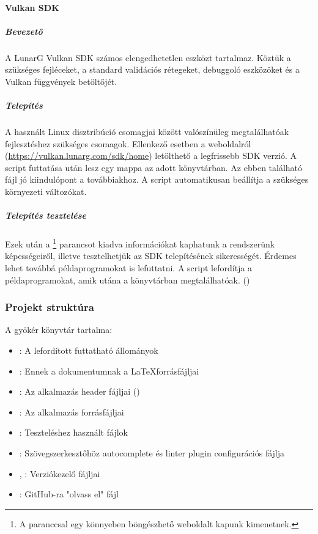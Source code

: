 \paragraph{Vulkan SDK}\label{vulkansdk}
\subparagraph{Bevezet\H o}
A LunarG Vulkan SDK sz\'amos elengedhetetlen eszk\"ozt tartalmaz. K\"ozt\"uk a sz\"uks\'eges fejl\'eceket, a standard valid\'aci\'os r\'etegeket, debuggol\'o eszk\"oz\"oket \'es a Vulkan f\"uggv\'enyek bet\"olt\H oj\'et.
\subparagraph{Telep\'it\'es}
A haszn\'alt Linux disztrib\'uci\'o csomagjai k\"oz\"ott val\'osz\'in\"uleg megtal\'alhat\'oak fejleszt\'eshez sz\"uks\'eges csomagok. 
\newline
Ellenkez\H o esetben a weboldalr\'ol (\url{https://vulkan.lunarg.com/sdk/home}) let\"olthet\H o a legfrissebb SDK verzi\'o.
A script futtat\'asa ut\'an lesz egy  mappa az adott k\"onyvt\'arban.
Az ebben tal\'alhat\'o  f\'ajl j\'o kiindul\'opont a tov\'abbiakhoz.
A  script automatikusan be\'all\'itja a sz\"uks\'eges k\"ornyezeti v\'altoz\'okat.
\subparagraph{Telep\'it\'es tesztel\'ese}
Ezek ut\'an a \footnote{A  paranccsal egy k\"onnyeben b\"ong\'eszhet\H o weboldalt kapunk kimenetnek.} parancsot kiadva inform\'aci\'okat kaphatunk a rendszer\"unk k\'epess\'egeir\H ol, illetve tesztelhetj\"uk az SDK telep\'it\'es\'enek sikeress\'eg\'et. 
\'Erdemes lehet tov\'abb\'a p\'eldaprogramokat is lefuttatni. A  script leford\'itja a p\'eldaprogramokat, amik ut\'ana a  k\"onyvt\'arban megtal\'alhat\'oak. ()

\subsubsection{Projekt strukt\'ura}
A gy\"ok\'er k\"onyvt\'ar tartalma:
\begin{itemize}
	\item {}: A leford\'itott futtathat\'o \'allom\'anyok
	\item {}: Ennek a dokumentumnak a \LaTeX forr\'asf\'ajljai
	\item {}: Az alkalmaz\'as header f\'ajljai ()
	\item {}: Az alkalmaz\'as forr\'asf\'ajljai
	\item {}: Tesztel\'eshez haszn\'alt f\'ajlok
	\item {}: Sz\"ovegszerkeszt\H oh\"oz autocomplete \'es linter plugin configur\'aci\'os f\'ajlja
	\item {}, : Verzi\'okezel\H o f\'ajljai
	\item {}: GitHub-ra "olvass el" f\'ajl
\end{itemize}

